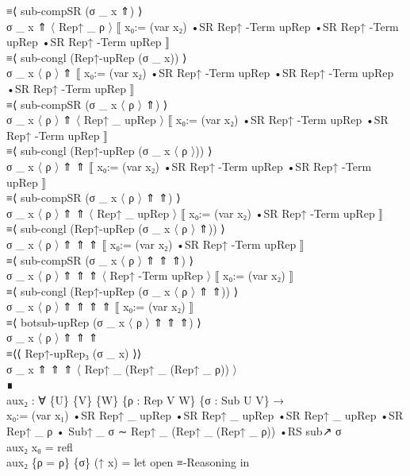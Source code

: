 {\begin{code}
{\>      ≡⟨ sub-compSR (σ \_ x ⇑) ⟩\<\\
\>        σ \_ x ⇑ 〈 Rep↑ \_ ρ 〉 ⟦ x₀:= (var x₂) •SR Rep↑ -Term upRep •SR Rep↑ -Term upRep •SR Rep↑ -Term upRep ⟧\<\\
\>      ≡⟨ sub-congl (Rep↑-upRep (σ \_ x)) ⟩\<\\
\>        σ \_ x 〈 ρ 〉 ⇑ ⟦ x₀:= (var x₂) •SR Rep↑ -Term upRep •SR Rep↑ -Term upRep •SR Rep↑ -Term upRep ⟧\<\\
\>      ≡⟨ sub-compSR (σ \_ x 〈 ρ 〉 ⇑) ⟩\<\\
\>        σ \_ x 〈 ρ 〉 ⇑ 〈 Rep↑ \_ upRep 〉 ⟦ x₀:= (var x₂) •SR Rep↑ -Term upRep •SR Rep↑ -Term upRep ⟧\<\\
\>      ≡⟨ sub-congl (Rep↑-upRep (σ \_ x 〈 ρ 〉)) ⟩\<\\
\>        σ \_ x 〈 ρ 〉 ⇑ ⇑ ⟦ x₀:= (var x₂) •SR Rep↑ -Term upRep •SR Rep↑ -Term upRep ⟧\<\\
\>      ≡⟨ sub-compSR (σ \_ x 〈 ρ 〉 ⇑ ⇑) ⟩\<\\
\>        σ \_ x 〈 ρ 〉 ⇑ ⇑ 〈 Rep↑ \_ upRep 〉 ⟦ x₀:= (var x₂) •SR Rep↑ -Term upRep ⟧\<\\
\>      ≡⟨ sub-congl (Rep↑-upRep (σ \_ x 〈 ρ 〉 ⇑)) ⟩\<\\
\>        σ \_ x 〈 ρ 〉 ⇑ ⇑ ⇑ ⟦ x₀:= (var x₂) •SR Rep↑ -Term upRep ⟧\<\\
\>      ≡⟨ sub-compSR (σ \_ x 〈 ρ 〉 ⇑ ⇑ ⇑) ⟩\<\\
\>        σ \_ x 〈 ρ 〉 ⇑ ⇑ ⇑ 〈 Rep↑ -Term upRep 〉 ⟦ x₀:= (var x₂) ⟧\<\\
\>      ≡⟨ sub-congl (Rep↑-upRep (σ \_ x 〈 ρ 〉 ⇑ ⇑)) ⟩\<\\
\>        σ \_ x 〈 ρ 〉 ⇑ ⇑ ⇑ ⇑ ⟦ x₀:= (var x₂) ⟧\<\\
\>      ≡⟨ botsub-upRep (σ \_ x 〈 ρ 〉 ⇑ ⇑ ⇑) ⟩\<\\
\>        σ \_ x 〈 ρ 〉 ⇑ ⇑ ⇑\<\\
\>      ≡⟨⟨ Rep↑-upRep₃ (σ \_ x) ⟩⟩\<\\
\>        σ \_ x ⇑ ⇑ ⇑ 〈 Rep↑ \_ (Rep↑ \_ (Rep↑ \_ ρ)) 〉\<\\
\>      ∎\<\\
\>    aux₂ : ∀ \{U\} \{V\} \{W\} \{ρ : Rep V W\} \{σ : Sub U V\} → \<\\
\>        x₀:= (var x₁) •SR Rep↑ \_ upRep •SR Rep↑ \_ upRep •SR Rep↑ \_ upRep •SR Rep↑ \_ ρ • Sub↑ \_ σ ∼ Rep↑ \_ (Rep↑ \_ (Rep↑ \_ ρ)) •RS sub↗ σ\<\\
\>    aux₂ x₀ = refl\<\\
\>    aux₂ \{ρ = ρ\} \{σ\} (↑ x) = let open ≡-Reasoning in \<\\
}
\end{code}}
